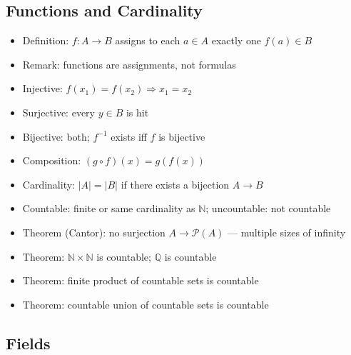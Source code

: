 \documentclass[
  10pt,
  letterpaper,
]{scrbook}
\providecommand{\tightlist}{%
  \setlength{\itemsep}{0pt}\setlength{\parskip}{0pt}}
\newcommand{\NN}{\mathbb{N}}
\newcommand{\QQ}{\mathbb{Q}}
\begin{document}
\subsection{Functions and Cardinality}\label{functions-and-cardinality}

\begin{itemize}
\tightlist
\item
  Definition: \(f: A \to B\) assigns to each \(a \in A\) exactly one
  \(f(a) \in B\)
\item
  Remark: functions are assignments, not formulas
\item
  Injective: \(f(x_1) = f(x_2) \Rightarrow x_1 = x_2\)
\item
  Surjective: every \(y \in B\) is hit
\item
  Bijective: both; \(f^{-1}\) exists iff \(f\) is bijective
\item
  Composition: \((g \circ f)(x) = g(f(x))\)
\item
  Cardinality: \(|A| = |B|\) if there exists a bijection \(A \to B\)
\item
  Countable: finite or same cardinality as \(\NN\); uncountable: not
  countable
\item
  Theorem (Cantor): no surjection \(A \to \mathcal{P}(A)\) --- multiple
  sizes of infinity
\item
  Theorem: \(\NN \times \NN\) is countable; \(\QQ\) is countable
\item
  Theorem: finite product of countable sets is countable
\item
  Theorem: countable union of countable sets is countable
\end{itemize}

\subsection{Fields}\label{fields}
\end{document}
